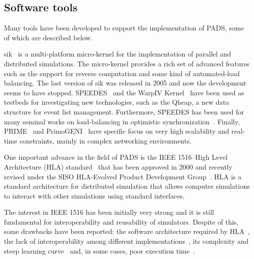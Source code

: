 \documentclass[1p]{elsarticle}
\begin{document}
\subsection{Software tools}

Many tools have been developed to support the implementation of PADS,
some of which are described below.

sik~\cite{Perumalla:2005:MPS:1069810.1070161} is a multi-platform
micro-kernel for the implementation of parallel and distributed
simulations. The micro-kernel provides a rich set of advanced features
such as the support for reverse computation and some kind of
automated-load balancing. The last version of sik was released in
2005 and now the development seems to have stopped.
SPEEDES~\cite{Steinman:2003:SPF:824475.825880} and the WarpIV
Kernel~\cite{Steinman_08s-siw-025warpiv} have been used as testbeds
for investigating new technologies, such as the Qheap, a new data
structure for event list management. Furthermore, SPEEDES has been
used for many seminal works on load-balancing in optimistic
synchronization~\cite{Wilson:1998:ELM:293172.293267,Wilson:1995:ALB:224401.224691}. Finally,
PRIME~\cite{prime} and PrimoGENI~\cite{5936747} have specific focus on
very high scalability and real-time constraints, mainly in complex
networking environments.

One important advance in the field of PADS is the IEEE 1516--High
Level Architecture (HLA) standard~\cite{ieee1516} that has been
approved in 2000 and recently revised under the SISO HLA-Evolved
Product Development Group~\cite{hla-evolved}. HLA is a standard
architecture for distributed simulation that allows computer
simulations to interact with other simulations using standard
interfaces.

The interest in IEEE 1516 has been initially very strong and it is
still fundamental for interoperability and reusability of simulators.
Despite of this, some drawbacks have been reported: the software 
architecture required by HLA~\cite{Davis:1999:HLA:324898.325337},
the lack of interoperability among different 
implementations~\cite{hlainteroperability}, its complexity and steep
learning curve~\cite{4736178} and, in some cases, poor execution
time~\cite{caihlaperformance}.
\end{document}
